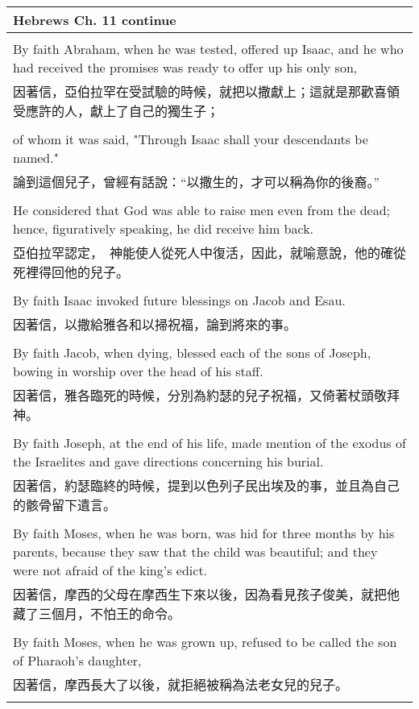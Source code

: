 \documentclass{book}
\begin{document}
\begin{tabularx}{\textwidth}{p{}}
\hline
Hebrews Ch. 11 continue \\
\hline \\
By faith Abraham, when he was tested, offered up Isaac, and he who had received the promises was ready to offer up his only son, \\
因著信，亞伯拉罕在受試驗的時候，就把以撒獻上；這就是那歡喜領受應許的人，獻上了自己的獨生子； \\ \\
of whom it was said, "Through Isaac shall your descendants be named." \\
論到這個兒子，曾經有話說：“以撒生的，才可以稱為你的後裔。” \\ \\
He considered that God was able to raise men even from the dead; hence, figuratively speaking, he did receive him back. \\
亞伯拉罕認定，　神能使人從死人中復活，因此，就喻意說，他的確從死裡得回他的兒子。 \\ \\
By faith Isaac invoked future blessings on Jacob and Esau. \\
因著信，以撒給雅各和以掃祝福，論到將來的事。 \\ \\
By faith Jacob, when dying, blessed each of the sons of Joseph, bowing in worship over the head of his staff. \\
因著信，雅各臨死的時候，分別為約瑟的兒子祝福，又倚著杖頭敬拜　神。 \\ \\
By faith Joseph, at the end of his life, made mention of the exodus of the Israelites and gave directions concerning his burial. \\
因著信，約瑟臨終的時候，提到以色列子民出埃及的事，並且為自己的骸骨留下遺言。 \\ \\
By faith Moses, when he was born, was hid for three months by his parents, because they saw that the child was beautiful; and they were not afraid of the king's edict. \\
因著信，摩西的父母在摩西生下來以後，因為看見孩子俊美，就把他藏了三個月，不怕王的命令。 \\ \\
By faith Moses, when he was grown up, refused to be called the son of Pharaoh's daughter, \\
因著信，摩西長大了以後，就拒絕被稱為法老女兒的兒子。 \\ \\

\end{tabularx}
\end{document}
